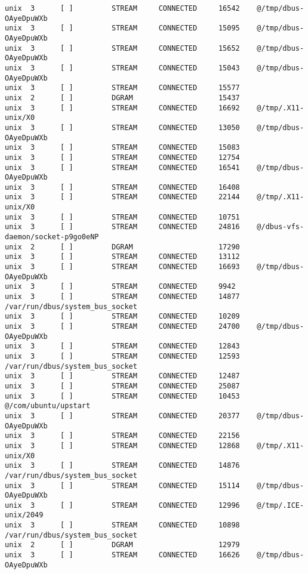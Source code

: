 \begin{lstlisting}
unix  3      [ ]         STREAM     CONNECTED     16542    @/tmp/dbus-OAyeDpuWXb
unix  3      [ ]         STREAM     CONNECTED     15095    @/tmp/dbus-OAyeDpuWXb
unix  3      [ ]         STREAM     CONNECTED     15652    @/tmp/dbus-OAyeDpuWXb
unix  3      [ ]         STREAM     CONNECTED     15043    @/tmp/dbus-OAyeDpuWXb
unix  3      [ ]         STREAM     CONNECTED     15577    
unix  2      [ ]         DGRAM                    15437    
unix  3      [ ]         STREAM     CONNECTED     16692    @/tmp/.X11-unix/X0
unix  3      [ ]         STREAM     CONNECTED     13050    @/tmp/dbus-OAyeDpuWXb
unix  3      [ ]         STREAM     CONNECTED     15083    
unix  3      [ ]         STREAM     CONNECTED     12754    
unix  3      [ ]         STREAM     CONNECTED     16541    @/tmp/dbus-OAyeDpuWXb
unix  3      [ ]         STREAM     CONNECTED     16408    
unix  3      [ ]         STREAM     CONNECTED     22144    @/tmp/.X11-unix/X0
unix  3      [ ]         STREAM     CONNECTED     10751    
unix  3      [ ]         STREAM     CONNECTED     24816    @/dbus-vfs-daemon/socket-p9go0eNP
unix  2      [ ]         DGRAM                    17290    
unix  3      [ ]         STREAM     CONNECTED     13112    
unix  3      [ ]         STREAM     CONNECTED     16693    @/tmp/dbus-OAyeDpuWXb
unix  3      [ ]         STREAM     CONNECTED     9942     
unix  3      [ ]         STREAM     CONNECTED     14877    /var/run/dbus/system_bus_socket
unix  3      [ ]         STREAM     CONNECTED     10209    
unix  3      [ ]         STREAM     CONNECTED     24700    @/tmp/dbus-OAyeDpuWXb
unix  3      [ ]         STREAM     CONNECTED     12843    
unix  3      [ ]         STREAM     CONNECTED     12593    /var/run/dbus/system_bus_socket
unix  3      [ ]         STREAM     CONNECTED     12487    
unix  3      [ ]         STREAM     CONNECTED     25087    
unix  3      [ ]         STREAM     CONNECTED     10453    @/com/ubuntu/upstart
unix  3      [ ]         STREAM     CONNECTED     20377    @/tmp/dbus-OAyeDpuWXb
unix  3      [ ]         STREAM     CONNECTED     22156    
unix  3      [ ]         STREAM     CONNECTED     12868    @/tmp/.X11-unix/X0
unix  3      [ ]         STREAM     CONNECTED     14876    /var/run/dbus/system_bus_socket
unix  3      [ ]         STREAM     CONNECTED     15114    @/tmp/dbus-OAyeDpuWXb
unix  3      [ ]         STREAM     CONNECTED     12996    @/tmp/.ICE-unix/2049
unix  3      [ ]         STREAM     CONNECTED     10898    /var/run/dbus/system_bus_socket
unix  2      [ ]         DGRAM                    12979    
unix  3      [ ]         STREAM     CONNECTED     16626    @/tmp/dbus-OAyeDpuWXb

\end{lstlisting}
